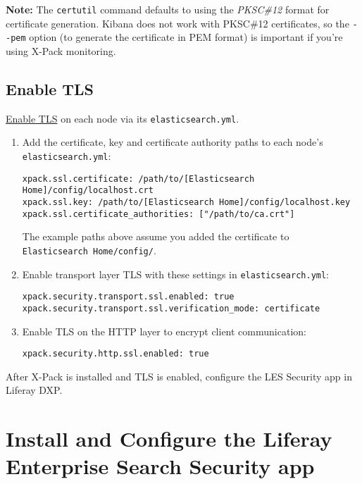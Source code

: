 \noindent\hrulefill

\textbf{Note:} The \texttt{certutil} command defaults to using the
\emph{PKSC\#12} format for certificate generation. Kibana does not work
with PKSC\#12 certificates, so the \texttt{-\/-pem} option (to generate
the certificate in PEM format) is important if you're using X-Pack
monitoring.

\noindent\hrulefill

\subsection{Enable TLS}\label{enable-tls-1}

\href{https://www.elastic.co/guide/en/elasticsearch/reference/6.1/configuring-tls.html\#enable-ssl}{Enable
TLS} on each node via its \texttt{elasticsearch.yml}.

\begin{enumerate}
\def\labelenumi{\arabic{enumi}.}
\item
  Add the certificate, key and certificate authority paths to each
  node's \texttt{elasticsearch.yml}:

\begin{verbatim}
xpack.ssl.certificate: /path/to/[Elasticsearch Home]/config/localhost.crt
xpack.ssl.key: /path/to/[Elasticsearch Home]/config/localhost.key
xpack.ssl.certificate_authorities: ["/path/to/ca.crt"]
\end{verbatim}

  The example paths above assume you added the certificate to
  \texttt{Elasticsearch\ Home/config/}.
\item
  Enable transport layer TLS with these settings in
  \texttt{elasticsearch.yml}:

\begin{verbatim}
xpack.security.transport.ssl.enabled: true
xpack.security.transport.ssl.verification_mode: certificate
\end{verbatim}
\item
  Enable TLS on the HTTP layer to encrypt client communication:

\begin{verbatim}
xpack.security.http.ssl.enabled: true
\end{verbatim}
\end{enumerate}

After X-Pack is installed and TLS is enabled, configure the LES Security
app in Liferay DXP.

\section{Install and Configure the Liferay Enterprise Search Security
app}\label{install-and-configure-the-liferay-enterprise-search-security-app-1}

